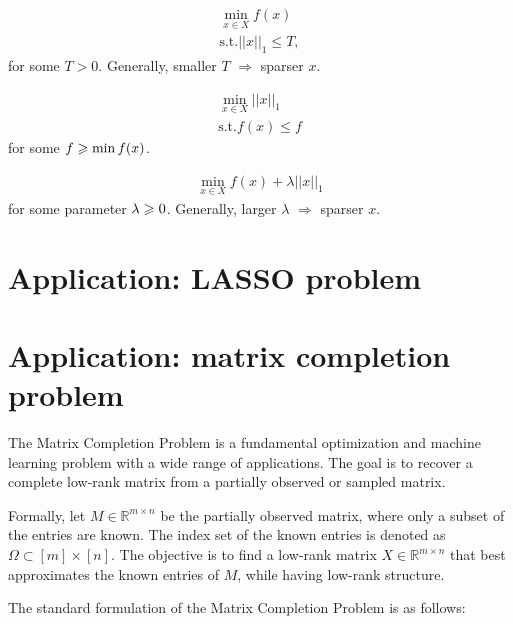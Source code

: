 \begin{equation}
    \begin{aligned}
        \min_{x\in X} f(x)\\
    \text{s.t.} ||x||_1 \leqslant T,
    \end{aligned}
\end{equation}
for some $T > 0$. Generally, smaller $T$ $\Rightarrow$ sparser $x$.


\begin{equation}
    \begin{aligned}
        \min_{x\in X} ||x||_1\\
        \text{s.t.} f(x) \leqslant f
    \end{aligned}
\end{equation}
for some $f \geqslant \min f(x)$.

\begin{equation}
    \begin{aligned}
        \min_{x\in X} f(x) + \lambda ||x||_1
    \end{aligned}
\end{equation}
for some parameter $\lambda \geqslant 0$. 
Generally, larger $\lambda$ $\Rightarrow$ sparser $x$.



\section{Application: LASSO problem}

\section{Application: matrix completion problem}

The Matrix Completion Problem is a fundamental optimization and machine learning problem with a wide range of applications. The goal is to recover a complete low-rank matrix from a partially observed or sampled matrix.

Formally, let $M \in \mathbb{R}^{m \times n}$ be the partially observed matrix, where only a subset of the entries are known. The index set of the known entries is denoted as $\Omega \subset [m] \times [n]$. The objective is to find a low-rank matrix $X \in \mathbb{R}^{m \times n}$ that best approximates the known entries of $M$, while having low-rank structure.

The standard formulation of the Matrix Completion Problem is as follows:

